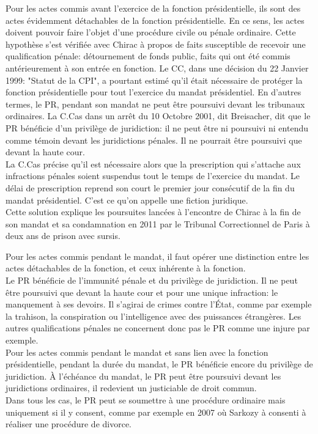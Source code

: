 \documentclass[12pt, a4paper, openany]{book}
\begin{document}
Pour les actes commis avant l'exercice de la fonction présidentielle, ils sont des actes évidemment détachables de la fonction présidentielle. En ce sens, les actes doivent pouvoir faire l'objet d'une procédure civile ou pénale ordinaire. Cette hypothèse s'est vérifiée avec Chirac à propos de faits susceptible de recevoir une qualification pénale: détournement de fonds public, faits qui ont été commis antérieurement à son entrée en fonction. Le CC, dans une décision du 22 Janvier 1999: "Statut de la CPI", a pourtant estimé qu'il était nécessaire de protéger la fonction présidentielle pour tout l'exercice du mandat présidentiel. En d'autres termes, le PR, pendant son mandat ne peut être poursuivi devant les tribunaux ordinaires. La C.Cas dans un arrêt du 10 Octobre 2001, dit Breisacher, dit que le PR bénéficie d'un privilège de juridiction: il ne peut être ni poursuivi ni entendu comme témoin devant les juridictions pénales. Il ne pourrait être poursuivi que devant la haute cour. \\
La C.Cas précise qu'il est nécessaire alors que la prescription qui s'attache aux infractions pénales soient suspendus tout le temps de l'exercice du mandat. Le délai de prescription reprend son court le premier jour consécutif de la fin du mandat présidentiel. C'est ce qu'on appelle une fiction juridique. \\
Cette solution explique les poursuites lancées à l'encontre de Chirac à la fin de son mandat et sa condamnation en 2011 par le Tribunal Correctionnel de Paris à deux ans de prison avec sursis.


Pour les actes commis pendant le mandat, il faut opérer une distinction entre les actes détachables de la fonction, et ceux inhérente à la fonction. \\
Le PR bénéficie de l'immunité pénale et du privilège de juridiction. Il ne peut être poursuivi que devant la haute cour et pour une unique infraction: le manquement à ses devoirs. Il s'agirai de crimes contre l'État, comme par exemple la trahison, la conspiration ou l'intelligence avec des puissances étrangères. Les autres qualifications pénales ne concernent donc pas le PR comme une injure par exemple. \\
Pour les actes commis pendant le mandat et sans lien avec la fonction présidentielle, pendant la durée du mandat, le PR bénéficie encore du privilège de juridiction. À l'échéance du mandat, le PR peut être poursuivi devant les juridictions ordinaires, il redevient un justiciable de droit commun. \\
Dans tous les cas, le PR peut se soumettre à une procédure ordinaire mais uniquement si il y consent, comme par exemple en 2007 où Sarkozy à consenti à réaliser une procédure de divorce. 
\end{document}
